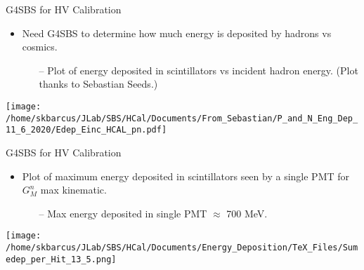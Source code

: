 \documentclass[10pt]{beamer}
\begin{document}
\begin{frame}{G4SBS for HV Calibration}

	\begin{itemize}
		\item Need G4SBS to determine how much energy is deposited by hadrons vs cosmics.
		\begin{itemize}
			\item[--] Plot of energy deposited in scintillators vs incident hadron energy. (Plot thanks to Sebastian Seeds.)
		\end{itemize}
	\end{itemize}

	\begin{center}
	\texttt{[image: /home/skbarcus/JLab/SBS/HCal/Documents/From\_Sebastian/P\_and\_N\_Eng\_Dep\_11\_6\_2020/Edep\_Einc\_HCAL\_pn.pdf]}
	\end{center}

\end{frame}

\begin{frame}{G4SBS for HV Calibration}

	\begin{itemize}
		\item Plot of maximum energy deposited in scintillators seen by a single PMT for $G_M^n$ max kinematic.
			\begin{itemize}
				\item[--] Max energy deposited in single PMT $\approx$ 700 MeV.
			\end{itemize}
	\end{itemize}

	\begin{center}
	\texttt{[image: /home/skbarcus/JLab/SBS/HCal/Documents/Energy\_Deposition/TeX\_Files/Sumedep\_per\_Hit\_13\_5.png]}
	\end{center}

\end{frame}
\end{document}
